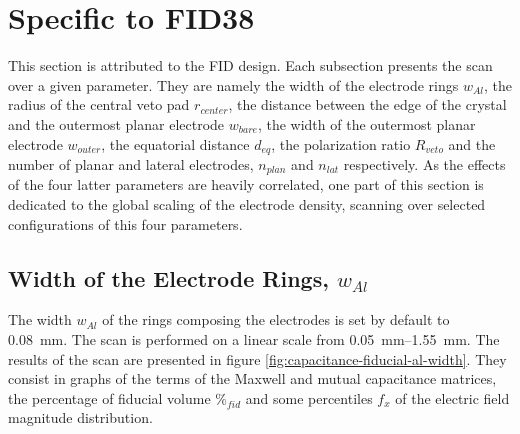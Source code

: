 

\section{Specific to FID38}

This section is attributed to the FID design. Each subsection presents the scan over a given parameter. They are namely the width of the electrode rings $w_{Al}$, the radius of the central veto pad $r_{center}$, the distance between the edge of the crystal and the outermost planar electrode $w_{bare}$, the width of the outermost planar electrode $w_{outer}$, the equatorial distance $d_{eq}$, the polarization ratio $R_{veto}$ and the number of planar and lateral electrodes, $n_{plan}$ and $n_{lat}$ respectively. As the effects of the four latter parameters are heavily correlated, one part of this section is dedicated to the global scaling of the electrode density, scanning over selected configurations of this four parameters.


\subsection{Width of the Electrode Rings, $w_{Al}$}

The width $w_{Al}$ of the rings composing the electrodes is set by default to \SI{0.08}{\mm}. The scan is performed on a linear scale from \SIrange{0.05}{1.55}{\mm}. The results of the scan are presented in figure \ref{fig:capacitance-fiducial-al-width}. They consist in graphs of the terms of the Maxwell and mutual capacitance matrices, the percentage of fiducial volume $\%_{fid}$ and some percentiles $f_x$ of the electric field magnitude distribution.

